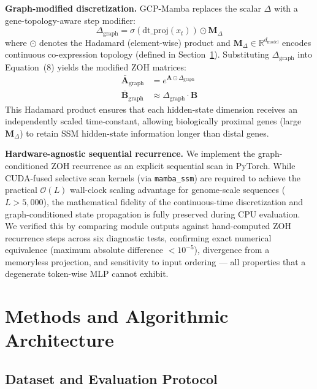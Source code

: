 \documentclass{bioinfo}
\begin{document}
\textbf{Graph-modified discretization.} GCP-Mamba replaces the scalar $\Delta$ with a gene-topology-aware step modifier:
\begin{equation}
\Delta_{\text{graph}} = \sigma(\text{dt\_proj}(x_t)) \odot \mathbf{M}_\Delta
\end{equation}
where $\odot$ denotes the Hadamard (element-wise) product and $\mathbf{M}_\Delta \in \mathbb{R}^{d_\text{model}}$ encodes continuous co-expression topology (defined in Section~\ref{sec:arch}). Substituting $\Delta_{\text{graph}}$ into Equation~(8) yields the modified ZOH matrices:
\begin{align}
\bar{\mathbf{A}}_{\text{graph}} &= e^{\mathbf{A} \odot \Delta_{\text{graph}}} \\
\bar{\mathbf{B}}_{\text{graph}} &\approx \Delta_{\text{graph}} \cdot \mathbf{B}
\end{align}
This Hadamard product ensures that each hidden-state dimension receives an independently scaled time-constant, allowing biologically proximal genes (large $\mathbf{M}_\Delta$) to retain SSM hidden-state information longer than distal genes.

\textbf{Hardware-agnostic sequential recurrence.} We implement the graph-conditioned ZOH recurrence as an explicit sequential scan in PyTorch. While CUDA-fused selective scan kernels (via \texttt{mamba\_ssm}) are required to achieve the practical $\mathcal{O}(L)$ wall-clock scaling advantage for genome-scale sequences ($L > 5{,}000$), the mathematical fidelity of the continuous-time discretization and graph-conditioned state propagation is fully preserved during CPU evaluation. We verified this by comparing module outputs against hand-computed ZOH recurrence steps across six diagnostic tests, confirming exact numerical equivalence (maximum absolute difference $< 10^{-5}$), divergence from a memoryless projection, and sensitivity to input ordering --- all properties that a degenerate token-wise MLP cannot exhibit.

\section{Methods and Algorithmic Architecture}
\label{sec:arch}
\subsection{Dataset and Evaluation Protocol}
\end{document}
